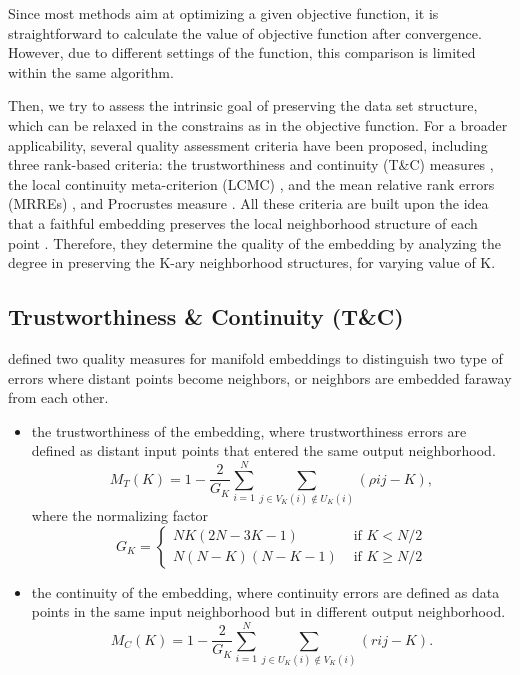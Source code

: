 \documentclass[11pt,a4paper,]{article}
\begin{document}
Since most methods aim at optimizing a given objective function, it is straightforward to calculate the value of objective function after convergence. However, due to different settings of the function, this comparison is limited within the same algorithm.

Then, we try to assess the intrinsic goal of preserving the data set structure, which can be relaxed in the constrains as in the objective function. For a broader applicability, several quality assessment criteria have been proposed, including three rank-based criteria: the trustworthiness and continuity (T\&C) measures \autocite{Venna2006-nd}, the local continuity meta-criterion (LCMC) \autocite{Chen2009-su}, and the mean relative rank errors (MRREs) \autocite{Lee2007-wq}, and Procrustes measure \autocite{Goldberg2009-tb}. All these criteria are built upon the idea that a faithful embedding preserves the local neighborhood structure of each point \autocite*{Goldberg2009-tb}.
Therefore, they determine the quality of the embedding by analyzing the degree in preserving the K-ary neighborhood structures, for varying value of K.

\hypertarget{trustworthiness-continuity-tc}{%
\subsection{Trustworthiness \& Continuity (T\&C)}\label{trustworthiness-continuity-tc}}

\textcite{Venna2006-nd} defined two quality measures for manifold embeddings to distinguish two type of errors where distant points become neighbors, or neighbors are embedded faraway from each other.

\begin{itemize}
\item
  the trustworthiness of the embedding, where trustworthiness errors are defined as distant input points that entered the same output neighborhood.
  \[M_{T}(K)=1-\frac{2}{G_{K}} \sum_{i=1}^{N} \sum_{j \in V_{K}(i) \notin U_{K}(i)}(\rho{ij}-K),\]
  where the normalizing factor
  \[
  G_{K}=\left\{\begin{array}{ll}
  N K(2 N-3 K-1) & \text { if } K<N / 2 \\
  N(N-K)(N-K-1) & \text { if } K \geqslant N / 2
  \end{array}\right.
  \]
\item
  the continuity of the embedding, where continuity errors are defined as data points in the same input neighborhood but in different output neighborhood.
  \[M_{C}(K)=1-\frac{2}{G_{K}} \sum_{i=1}^{N} \sum_{j \in U_{K}(i) \notin V_{K}(i)}(r{ij}-K).\]
\end{itemize}
\end{document}
